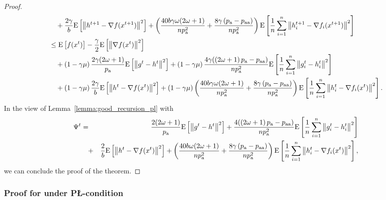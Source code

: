 \documentclass{article}
\newcommand{\algorithmname}{DASHA-PP}
\newcommand*{\probavailable}{\ensuremath{p_{\textnormal{a}}}}
\newcommand*{\probpairaa}{\ensuremath{p_{\textnormal{aa}}}}
\begin{document}
\begin{proof}
\begin{align*}
      &\quad  + \frac{2\gamma}{b} \Exp{\norm{h^{t+1} - \nabla f(x^{t+1})}^2} + \left(\frac{40 b \gamma \omega (2 \omega + 1)}{n \probavailable^2} + \frac{8 \gamma \left(\probavailable - \probpairaa\right)}{n \probavailable^2}\right) \Exp{\frac{1}{n}\sum_{i=1}^n\norm{h^{t+1}_i - \nabla f_i(x^{t+1})}^2}\\
      &\leq \Exp{f(x^t)} - \frac{\gamma}{2}\Exp{\norm{\nabla f(x^t)}^2} \\
      &\quad + \left(1 - \gamma \mu\right)\frac{2\gamma (2 \omega + 1)}{\probavailable} \Exp{\norm{g^{t} - h^{t}}^2} + \left(1 - \gamma \mu\right)\frac{4\gamma (\left(2 \omega + 1\right)\probavailable - \probpairaa)}{n \probavailable^2} \Exp{\frac{1}{n}\sum_{i=1}^n\norm{g^{t}_i - h^{t}_i}^2} \\
      &\quad + \left(1 - \gamma \mu\right)\frac{2\gamma}{b} \Exp{\norm{h^{t} - \nabla f(x^{t})}^2} + \left(1 - \gamma \mu\right)\left(\frac{40 b \gamma \omega (2 \omega + 1)}{n \probavailable^2} + \frac{8 \gamma \left(\probavailable - \probpairaa\right)}{n \probavailable^2}\right)\Exp{\frac{1}{n}\sum_{i=1}^n\norm{h^{t}_i - \nabla f_i(x^{t})}^2}.
    \end{align*}
    In the view of Lemma~\ref{lemma:good_recursion_pl} with
    \begin{eqnarray*}
        \Psi^t &=& \frac{2(2 \omega + 1)}{\probavailable} \Exp{\norm{g^{t} - h^{t}}^2} + \frac{4(\left(2 \omega + 1\right)\probavailable - \probpairaa)}{n \probavailable^2} \Exp{\frac{1}{n}\sum_{i=1}^n\norm{g^{t}_i - h^{t}_i}^2} \\
        &\quad +& \frac{2}{b} \Exp{\norm{h^{t} - \nabla f(x^{t})}^2} + \left(\frac{40 b \omega (2 \omega + 1)}{n \probavailable^2} + \frac{8 \gamma \left(\probavailable - \probpairaa\right)}{n \probavailable^2}\right)\Exp{\frac{1}{n}\sum_{i=1}^n\norm{h^{t}_i - \nabla f_i(x^{t})}^2},
    \end{eqnarray*}
    we can conclude the proof of the theorem.
\end{proof}

\subsubsection{Proof for \algname{\algorithmname-PAGE} under P\L-condition}

\CONVERGENCEPLPAGE*
\end{document}
